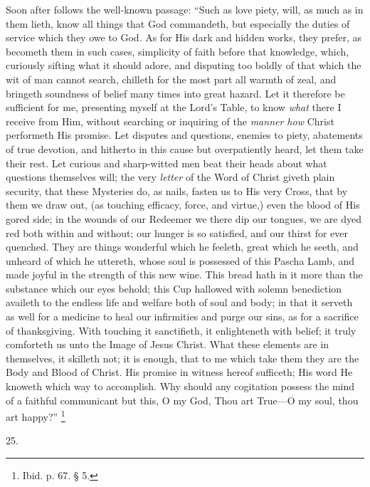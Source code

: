 Soon after follows the well-known passage: ``Such
as love piety, will, as much as in them lieth, know all things that
God commandeth, but especially the duties of service which they owe to
God. As for His dark and hidden works, they prefer, as becometh them
in such cases, simplicity of faith before that knowledge, which,
curiously sifting what it should adore, and disputing too boldly of
that which the wit of man cannot search, chilleth for the most part
all warmth of zeal, and bringeth soundness of belief many times into
great hazard. Let it therefore be sufficient for me, presenting myself
at the Lord's Table, to know \emph{what} there I receive from Him,
without searching or inquiring of the \emph{manner how} Christ
performeth His promise. Let disputes and questions, enemies to piety,
abatements of true devotion, and hitherto in this cause but
overpatiently heard, let them take their rest. Let curious and
sharp-witted men beat their heads about what questions themselves
will; the very \emph{letter} of the Word of Christ giveth plain
security, that these Mysteries do, as nails, fasten us to His very
Cross, that by them we draw out, (as touching efficacy, force, and
virtue,) even the blood of His gored side; in the wounds of our
Redeemer we there dip our tongues, we are dyed red both within and
without; our hunger is so satisfied, and our thirst for ever quenched.
They are things wonderful which he feeleth, great which he seeth, and
unheard of which he uttereth, whose soul is possessed of this Pascha
Lamb, and made joyful in the strength of this new wine. This bread
hath in it more than the substance which our eyes behold; this Cup
hallowed with solemn benediction availeth to the endless life and
welfare both of soul and body; in that it serveth as well for a
medicine to heal our infirmities and purge our sins, as for a
sacrifice of thanksgiving. With touching it sanctifieth, it
enlighteneth with belief; it truly comforteth us unto the Image of
Jesus Christ. What these elements are in themselves, it skilleth
not; it is enough, that to me which take them they are the Body and
Blood of Christ. His promise in witness hereof sufficeth; His word He
knoweth which way to accomplish. Why should any cogitation possess the
mind of a faithful communicant but this, O my God, Thou art True—O
my soul, thou art happy?'' \footnote{Ibid. p. 67. § 5.}

25.

